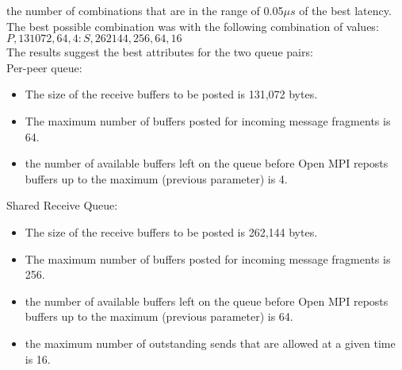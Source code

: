  the
number of combinations that are in the range of 0.05$\mu s$ of the
best latency. The best possible combination was with the following
combination of values:
$P,131072,64,4:S,262144,256,64,16$\\
The results suggest the best attributes for the two queue pairs:\\
Per-peer queue:
\begin{itemize}
\item The size of the receive buffers to be posted is 131,072 bytes.
\item The maximum number of buffers posted for incoming message
  fragments is 64.
\item the number of available buffers left on the queue before Open
  MPI reposts buffers up to the maximum (previous parameter) is 4.
\end{itemize}
Shared Receive Queue:
\begin{itemize}
\item The size of the receive buffers to be posted is 262,144 bytes.
\item The maximum number of buffers posted for incoming message
  fragments is 256.
\item the number of available buffers left on the queue before Open
  MPI reposts buffers up to the maximum (previous parameter) is 64.
\item the maximum number of outstanding sends that are allowed at a
  given time is 16.
\end{itemize}

